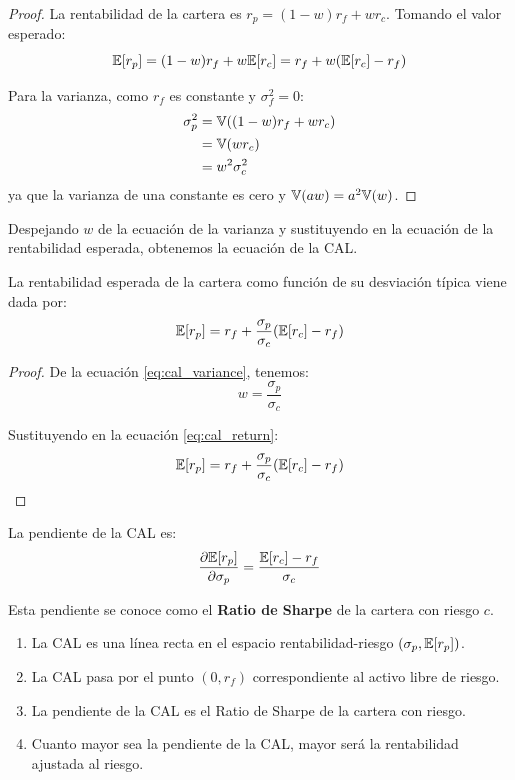 \begin{proof}
La rentabilidad de la cartera es $r_p = (1-w)r_f + w r_c$. Tomando el valor esperado:
$$\mathbb{E}[r_p] = (1-w)r_f + w\mathbb{E}[r_c] = r_f + w(\mathbb{E}[r_c] - r_f)$$

Para la varianza, como $r_f$ es constante y $\sigma_f^2 = 0$:
\begin{align*}
\sigma_p^2 &= \mathbb{V}((1-w)r_f + w r_c) \\
&= \mathbb{V}(w r_c) \\
&= w^2 \sigma_c^2
\end{align*}
ya que la varianza de una constante es cero y $\mathbb{V}(aw) = a^2\mathbb{V}(w)$.
\end{proof}

Despejando $w$ de la ecuación de la varianza y sustituyendo en la ecuación de la rentabilidad esperada, obtenemos la ecuación de la CAL.

\begin{teorema}
La rentabilidad esperada de la cartera como función de su desviación típica viene dada por:
\begin{equation}
\mathbb{E}[r_p] = r_f + \frac{\sigma_p}{\sigma_c} (\mathbb{E}[r_c] - r_f)
\end{equation}
\end{teorema}

\begin{proof}
De la ecuación \eqref{eq:cal_variance}, tenemos:
$$w = \frac{\sigma_p}{\sigma_c}$$

Sustituyendo en la ecuación \eqref{eq:cal_return}:
$$\mathbb{E}[r_p] = r_f + \frac{\sigma_p}{\sigma_c} (\mathbb{E}[r_c] - r_f)$$
\end{proof}

La pendiente de la CAL es:
\begin{equation}
\frac{\partial \mathbb{E}[r_p]}{\partial \sigma_p} = \frac{\mathbb{E}[r_c] - r_f}{\sigma_c}
\end{equation}

Esta pendiente se conoce como el \textbf{Ratio de Sharpe} de la cartera con riesgo $c$.

\begin{proposicion}
\begin{enumerate}
\item La CAL es una línea recta en el espacio rentabilidad-riesgo $(\sigma_p, \mathbb{E}[r_p])$.
\item La CAL pasa por el punto $(0, r_f)$ correspondiente al activo libre de riesgo.
\item La pendiente de la CAL es el Ratio de Sharpe de la cartera con riesgo.
\item Cuanto mayor sea la pendiente de la CAL, mayor será la rentabilidad ajustada al riesgo.
\end{enumerate}
\end{proposicion}

